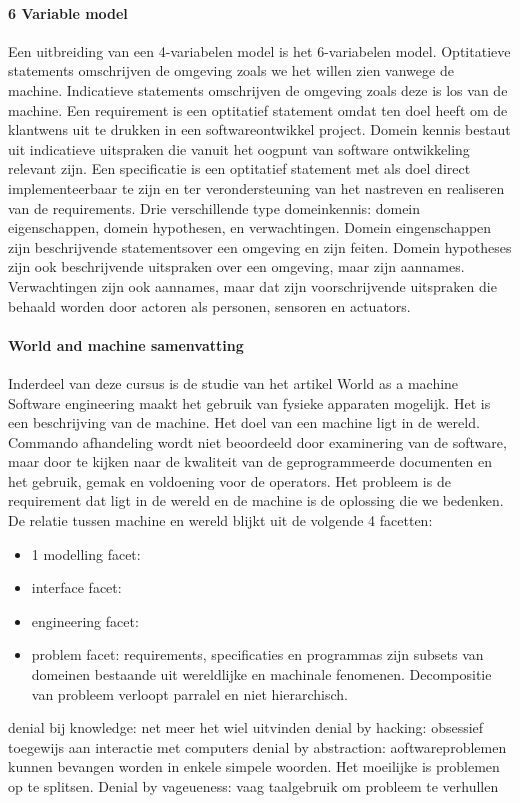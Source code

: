 \documentclass{article}
\begin{document}
	
	\paragraph{6 Variable model}
	Een uitbreiding van een 4-variabelen model is het 6-variabelen model.
	Optitatieve statements omschrijven de omgeving zoals we het willen zien vanwege de machine. 
	Indicatieve statements omschrijven de omgeving zoals deze is los van de machine. 
	Een requirement is een optitatief statement omdat ten doel heeft om de klantwens uit te drukken in een softwareontwikkel project. 
	Domein kennis bestaut uit indicatieve uitspraken die vanuit het oogpunt van software ontwikkeling relevant zijn. 
	Een specificatie is een optitatief statement met als doel direct implementeerbaar te zijn en ter verondersteuning van het nastreven en realiseren van de requirements. 
	Drie verschillende type domeinkennis: domein eigenschappen, domein hypothesen, en verwachtingen. 
	Domein eingenschappen  zijn beschrijvende statementsover een omgeving en zijn feiten. Domein hypotheses  zijn ook beschrijvende uitspraken over een omgeving, maar zijn aannames. 
	Verwachtingen zijn ook aannames, maar dat zijn voorschrijvende uitspraken die behaald worden door actoren als personen, sensoren en actuators. 
	
	\paragraph{World and machine samenvatting}
	Inderdeel van deze cursus is de studie van het artikel World as a machine \cite{jacksonworldmachine}
	Software engineering maakt het gebruik van fysieke apparaten mogelijk. Het is een beschrijving van de machine. Het doel van een machine ligt in de wereld.
	Commando afhandeling wordt niet  beoordeeld door examinering van de software, maar door te kijken naar de kwaliteit van de geprogrammeerde documenten en het gebruik, gemak en voldoening voor de operators.
	Het probleem is de requirement dat ligt in de wereld en de machine is de oplossing die we bedenken. De  relatie tussen machine en wereld  blijkt uit de volgende 4 facetten:
	\begin{itemize}
		\item 1 modelling facet:
		\item interface facet:
		\item engineering facet:
		\item problem facet: requirements, specificaties en programmas zijn subsets van  domeinen bestaande uit wereldlijke en machinale fenomenen. Decompositie van  probleem verloopt parralel en niet hierarchisch.
	\end{itemize}
	denial bij knowledge: net meer het wiel uitvinden
	denial by hacking: obsessief toegewijs aan interactie met computers
	denial by abstraction: aoftwareproblemen kunnen bevangen worden in enkele simpele woorden. Het moeilijke is problemen op te splitsen.
	Denial by vageueness: vaag taalgebruik om probleem te verhullen
	
\end{document}
